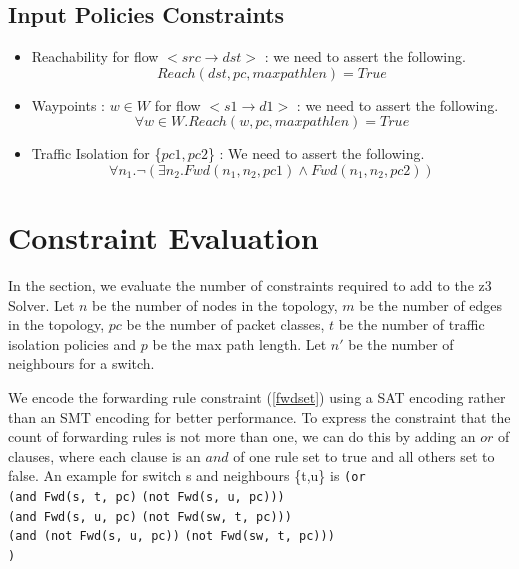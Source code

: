 \documentclass[]{sig}
\begin{document}
\subsection{Input Policies Constraints}
\begin{itemize}
	\item Reachability for flow $<src \rightarrow dst>$ : we need to assert the following. \\ 
\begin{equation}
		Reach(dst,pc,maxpathlen) = True \label{reach}
\end{equation}
	\item Waypoints :  $w \in W$ for flow $<s1 \rightarrow d1>$ : we need to assert the following.
\begin{equation}
	 \forall w \in W.Reach(w,pc, maxpathlen) = True \label{waypoint}
\end{equation}
	 \item Traffic Isolation for \{$pc1,pc2$\} : We need to assert the following.\\
	 \begin{equation}
		 \forall n_1. \neg ( \exists n_2. Fwd(n_1,n_2,pc1) \wedge Fwd(n_1,n_2,pc2)) \label{isolation}
	 \end{equation}
\end{itemize}

\section{Constraint Evaluation}
In the section, we evaluate the number of constraints required to add to the z3 Solver. Let $n$ be the number of nodes in the topology, $m$ be the number of edges in the topology, $pc$ be the number of packet classes, $t$ be the number of traffic isolation policies and $p$ be the max path length. Let $n'$ be the number of neighbours for a switch.

We encode the forwarding rule constraint (\cref{fwdset}) using a SAT encoding rather than an SMT encoding for better performance. To express the constraint that the count of forwarding rules is not more than one, we can do this by adding an $or$ of clauses, where each clause is an $and$ of one rule set to true and all others set to false. An example for switch s and neighbours \{t,u\} is \newline
\verb|(or| \\
\hspace*{10pt}\verb|(and Fwd(s, t, pc)|  \verb|(not Fwd(s, u, pc)))| \\
\hspace*{10pt}\verb|(and Fwd(s, u, pc)|  \verb|(not Fwd(sw, t, pc)))| \\
\hspace*{10pt}\verb|(and (not Fwd(s, u, pc))|  \verb|(not Fwd(sw, t, pc)))|\\
\verb|)| 
\end{document}
